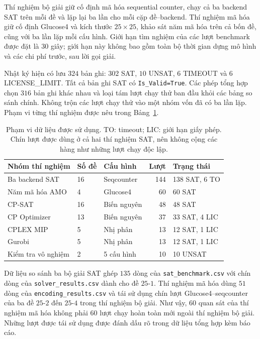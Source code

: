 \documentclass[a4paper,fleqn]{cas-sc}
\begin{document}
Thí nghiệm bộ giải giữ cố định mã hóa sequential counter, chạy cả ba
backend SAT trên mỗi đề và lặp lại ba lần cho mỗi cặp đề--backend.
Thí nghiệm mã hóa giữ cố định Glucose4 và kích thước $25\times25$,
khảo sát năm mã hóa trên cả bốn đề, cũng với ba lần lặp mỗi cấu hình.
Giới hạn tìm nghiệm của các lượt benchmark được đặt là $30$ giây;
giới hạn này không bao gồm toàn bộ thời gian dựng mô hình và các chi
phí trước, sau lời gọi giải.

Nhật ký hiện có lưu $324$ bản ghi: $302$ SAT, $10$ UNSAT,
$6$ TIMEOUT và $6$ LICENSE\_LIMIT. Tất cả bản ghi SAT có
\texttt{Is\_Valid=True}. Các phép tổng hợp chọn $316$ bản ghi khác nhau
và loại tám lượt chạy thử ban đầu khỏi các bảng so sánh chính.
Không trộn các lượt chạy thử vào một nhóm vốn đã có ba lần lặp.
Phạm vi từng thí nghiệm được nêu trong
Bảng~\ref{tab:exp-coverage}.

\begin{table}[pos=htbp]
 \centering
 \caption{Phạm vi dữ liệu được sử dụng. TO: timeout; LIC: giới hạn giấy phép. Chín lượt được dùng ở cả hai thí nghiệm SAT, nên không cộng các hàng như những lượt chạy độc lập.}
 \label{tab:exp-coverage}
 \begin{tabular}{lllr l}
  \toprule
  Nhóm thí nghiệm & Số đề & Cấu hình & Lượt & Trạng thái \\
  \midrule
  Ba backend SAT & 16 & Seqcounter & 144 & 138 SAT, 6 TO \\
  Năm mã hóa AMO & 4 & Glucose4 & 60 & 60 SAT \\
  CP-SAT & 16 & Biến nguyên & 48 & 48 SAT \\
  CP Optimizer & 13 & Biến nguyên & 37 & 33 SAT, 4 LIC \\
  CPLEX MIP & 5 & Nhị phân & 13 & 12 SAT, 1 LIC \\
  Gurobi & 5 & Nhị phân & 13 & 12 SAT, 1 LIC \\
  Kiểm tra vô nghiệm & 2 & 5 cấu hình & 10 & 10 UNSAT \\
  \bottomrule
 \end{tabular}
\end{table}

Dữ liệu so sánh ba bộ giải SAT ghép $135$ dòng của
\texttt{sat\_benchmark.csv} với chín dòng của
\texttt{solver\_results.csv} dành cho đề $25$-$1$.
Thí nghiệm mã hóa dùng $51$ dòng của \texttt{encoding\_results.csv} và
tái sử dụng chín lượt Glucose4--seqcounter của ba đề $25$-$2$ đến
$25$-$4$ trong thí nghiệm bộ giải. Như vậy, $60$ quan sát của thí
nghiệm mã hóa không phải $60$ lượt chạy hoàn toàn mới ngoài thí nghiệm
bộ giải. Những lượt được tái sử dụng được đánh dấu rõ trong dữ liệu
tổng hợp kèm báo cáo.
\end{document}

